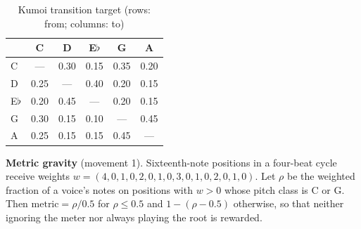 \documentclass[conference]{IEEEtran}
\newcommand{\fl}{$\flat$}
\begin{document}
\begin{table}[h]
\centering
\footnotesize
\caption{Kumoi transition target (rows: from; columns: to)}
\label{tab:kumoi}
\begin{tabular}{@{}lccccc@{}}
\toprule
 & C & D & E\fl & G & A \\
\midrule
C   & --- & 0.30 & 0.15 & 0.35 & 0.20 \\
D   & 0.25 & --- & 0.40 & 0.20 & 0.15 \\
E\fl & 0.20 & 0.45 & --- & 0.20 & 0.15 \\
G   & 0.30 & 0.15 & 0.10 & --- & 0.45 \\
A   & 0.25 & 0.15 & 0.15 & 0.45 & --- \\
\bottomrule
\end{tabular}
\end{table}

\textbf{Metric gravity} (movement 1). Sixteenth-note positions in a four-beat cycle receive weights $w = (4, 0, 1, 0, 2, 0, 1, 0, 3, 0, 1, 0, 2, 0, 1, 0)$. Let $\rho$ be the weighted fraction of a voice's notes on positions with $w > 0$ whose pitch class is C or G. Then $\text{metric} = \rho / 0.5$ for $\rho \le 0.5$ and $1 - (\rho - 0.5)$ otherwise, so that neither ignoring the meter nor always playing the root is rewarded.
\end{document}
